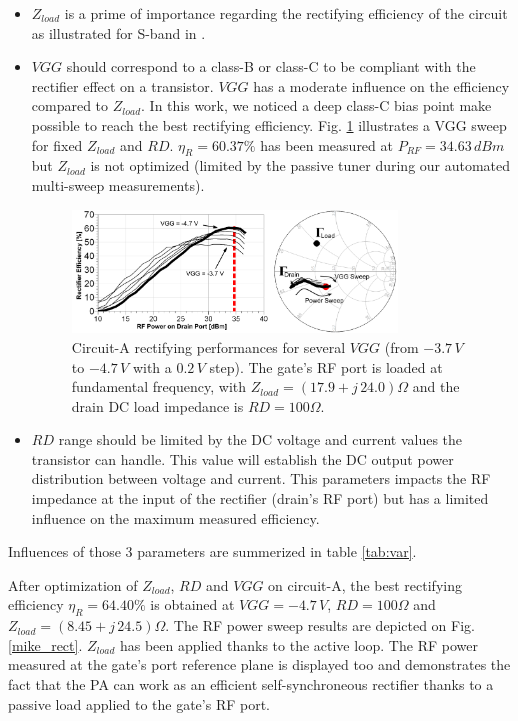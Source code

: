 \documentclass[conference]{IEEEtran}
\begin{document}
\begin{itemize}
	\item {$Z_{load}$ is a prime of importance regarding the rectifying efficiency of the circuit as illustrated for S-band in \cite{Reveyrand2012}.\\}
		
	\item {$VGG$ should correspond to a class-B or class-C to be compliant with the rectifier effect on a transistor. $VGG$ has a moderate influence on the efficiency compared to $Z_{load}$. In this work, we noticed a deep class-C bias point make possible to reach the best rectifying efficiency. Fig. \ref{mike_rect_mVGG} illustrates a VGG sweep for fixed $Z_{load}$ and $RD$. $\eta_R=60.37\%$ has been measured at $P_{RF}=34.63\,dBm$ but $Z_{load}$ is not optimized (limited by the passive tuner during our automated multi-sweep measurements).}

\begin{figure}[ht!] %
\centering
\includegraphics[width=3.4in]{IMS2014_Mike_Rectifier_mVGG.pdf}
\caption{ Circuit-A rectifying performances for several $VGG$ (from $-3.7\,V$ to $-4.7\,V$ with a $0.2\,V$ step). The gate's RF port is loaded at fundamental frequency, with $Z_{load}=(17.9+j\,24.0)\Omega$ and the drain DC load impedance is $RD=100\Omega$.}
\label{mike_rect_mVGG}
\end{figure}

	\item {$RD$ range should be limited by the DC voltage and current values the transistor can handle. This value will establish the DC output power distribution between voltage and current. This parameters impacts the RF impedance at the input of the rectifier (drain's RF port) but has a limited influence on the maximum measured efficiency.}
\end{itemize}
Influences of those 3 parameters are summerized in table \ref{tab:var}.

After optimization of $Z_{load}$, $RD$ and $VGG$ on circuit-A, the best rectifying efficiency $\eta_R=64.40\%$ is obtained at $VGG=-4.7\,V$, $RD=100\Omega$ and  $Z_{load}=(8.45+j\,24.5)\Omega$. The RF power sweep results are depicted on Fig. \ref{mike_rect}. $Z_{load}$ has been applied thanks to the active loop. The RF power measured at the gate's port reference plane is displayed too and demonstrates the fact that the PA can work as an efficient self-synchroneous rectifier thanks to a passive load applied to the gate's RF port.
\end{document}
